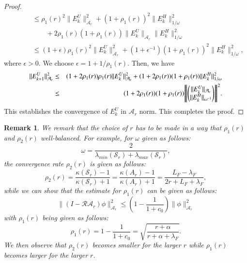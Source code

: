 \documentclass{article}
\newtheorem{remark}{Remark}
\newcommand{\vertiii}[1]{{\left\vert\kern-0.25ex\left\vert\kern-0.25ex\left\vert #1 
    \right\vert\kern-0.25ex\right\vert\kern-0.25ex\right\vert}}
\theoremstyle{definition}
\begin{document}
\begin{proof}
\begin{eqnarray*}
&& \qquad \leq \rho_1(r)^2 \|E_k^U\|_{\mathcal{A}_r}^2 + (1 + \rho_1(r))^2 \|E_k^H\|_{1/\omega}^2 \\
&& \qquad \qquad + 2 \rho_1(r) (1 + \rho_1(r)) \|E_k^U\|_{\mathcal{A}_r} \|E_k^H\|_{1/\omega}^2 \\
&& \qquad \leq (1 + \epsilon) \rho_1(r)^2 \|E_k^U\|_{\mathcal{A}_r}^2 + (1 + \epsilon^{-1}) (1 + \rho_1(r))^2 \|E_k^H\|_{1/\omega}^2,   
\end{eqnarray*}
where $\epsilon > 0$. We choose $\epsilon = 1 + 1/\rho_1(r)$. Then, we have 
\begin{eqnarray*}
\|E^U_{k+1}\|_{\mathcal{A}_r}^2 &\leq& (1 + 2 \rho_1(r)) \rho_1(r) \|E_k^U\|_{\mathcal{A}_r}^2 + (1 + 2\rho_1(r))(1 +  \rho_1(r)) \|E_k^H\|_{1/\omega}^2 \\ 
&\leq&(1 + 2 \rho_1(r)) (1 + \rho_1(r)) \vertiii{\begin{pmatrix} \|E_k^U\|_{\mathcal{A}_r} \\
\|E_k^H\|_{\omega^{-1}} \end{pmatrix}}^2.
\end{eqnarray*}
This establishes the convergence of $E_k^U$ in $\mathcal{A}_r$ norm. This completes the proof. 
\end{proof} 
\begin{remark}
We remark that the choice of $r$ has to be made in a way that $\rho_1(r)$ and $\rho_2(r)$ well-balanced. For example, for $\omega$ given as follows:
\begin{equation}
\omega = \frac{2}{\lambda_{min}(\mathcal{S}_r) + \lambda_{max}(\mathcal{S}_r)},
\end{equation}
the convergence rate $\rho_2(r)$ is given as follows: 
\begin{equation}
\rho_2(r) = \frac{\kappa(\mathcal{S}_r) - 1}{\kappa(\mathcal{S}_r) + 1} = \frac{\kappa(A_r) - 1}{\kappa(A_r) + 1} = \frac{L_F - \lambda_F}{2r + L_F + \lambda_F}, 
\end{equation}
while we can show that the estimate for $\rho_1(r)$ can be given as follows: 
\begin{equation}
\|(I - \mathcal{R} \mathcal{A}_r) \phi \|_{\mathcal{A}_r}^2 \leq \left (1 - \frac{1}{1 + c_0} \right )  \|\phi\|_{\mathcal{A}_r}^2 
\end{equation} 
with $\rho_1(r)$ being given as follows:
\begin{equation}
\rho_1(r) = 1 - \frac{1}{1 + c_0} = \sqrt{\frac{ r + \alpha }{ r + \alpha + \lambda_F}}. 
\end{equation} 
We then observe that $\rho_2(r)$ becomes smaller for the larger $r$ while $\rho_1(r)$ becomes larger for the larger $r$. 
\end{remark} 
\end{document}
